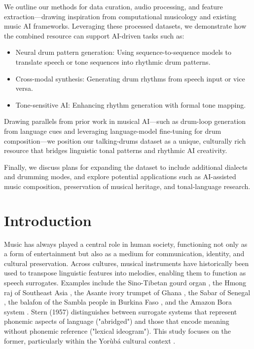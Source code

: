 \documentclass[12pt,a4paper]{article}
\begin{document}
We outline our methods for data curation, audio processing, and feature extraction—drawing inspiration from computational musicology and existing music AI frameworks. Leveraging these processed datasets, we demonstrate how the combined resource can support AI-driven tasks such as:

\begin{itemize}
\item Neural drum pattern generation: Using sequence-to-sequence models to translate speech or tone sequences into rhythmic drum patterns.
\item Cross-modal synthesis: Generating drum rhythms from speech input or vice versa.
\item Tone-sensitive AI: Enhancing rhythm generation with formal tone mapping.
\end{itemize}

Drawing parallels from prior work in musical AI—such as drum-loop generation from language cues and leveraging language-model fine-tuning for drum composition—we position our talking-drums dataset as a unique, culturally rich resource that bridges linguistic tonal patterns and rhythmic AI creativity.

Finally, we discuss plans for expanding the dataset to include additional dialects and drumming modes, and explore potential applications such as AI-assisted music composition, preservation of musical heritage, and tonal-language research.

\newpage

\section{Introduction}

Music has always played a central role in human society, functioning not only as a form of entertainment but also as a medium for communication, identity, and cultural preservation. Across cultures, musical instruments have historically been used to transpose linguistic features into melodies, enabling them to function as speech surrogates. Examples include the Sino-Tibetan gourd organ \cite{bradley1979}, the Hmong raj of Southeast Asia \cite{poss2005,poss2012}, the Asante ivory trumpet of Ghana \cite{kaminski2008}, the Sabar of Senegal \cite{winter2014}, the balafon of the Sambla people in Burkina Faso \cite{mcpherson2018}, and the Amazon Bora system \cite{seifart2018}. Stern (1957) distinguishes between surrogate systems that represent phonemic aspects of language ("abridged") and those that encode meaning without phonemic reference ("lexical ideogram"). This study focuses on the former, particularly within the Yorùbá cultural context \cite{akinbo2021}.
\end{document}
